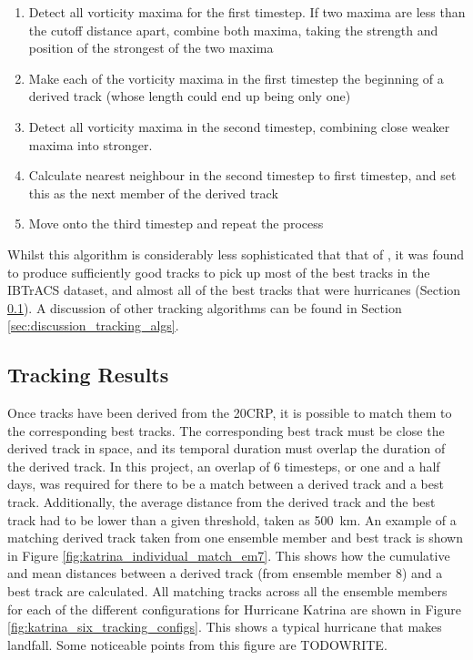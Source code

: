 \documentclass[pdftex,12pt,a4paper]{report}
\begin{document}
\begin{enumerate}
    \item Detect all vorticity maxima for the first timestep. If two maxima are less than the cutoff
        distance apart, combine both maxima, taking the strength and position of the strongest of
        the two maxima
    \item Make each of the vorticity maxima in the first timestep the beginning of a derived track
        (whose length could end up being only one)
    \item Detect all vorticity maxima in the second timestep, combining close weaker maxima into
        stronger. %
    \item Calculate nearest neighbour in the second timestep to first timestep, and set this as the
        next member of the derived track
    \item Move onto the third timestep and repeat the process
\end{enumerate}

Whilst this algorithm is considerably less sophisticated that that of \textcite{hodges1994}, it was
found to produce sufficiently good tracks to pick up most of the best tracks in the IBTrACS dataset,
and almost all of the best tracks that were hurricanes (Section  \ref{sec:results_tracking}). A
discussion of other tracking algorithms can be found in Section \ref{sec:discussion_tracking_algs}.

\subsection{Tracking Results}
\label{sec:results_tracking}

Once tracks have been derived from the 20CRP, it is possible to match them to the corresponding best
tracks. The corresponding best track must be close the derived track in space, and its temporal
duration must overlap the duration of the derived track. In this project, an overlap of 6 timesteps,
or one and a half days, was required for there to be a match between a derived track and a best
track.  Additionally, the average distance from the derived track and the best track had to be lower
than a given threshold, taken as \SI{500}{km}. An example of a matching derived track taken from
one ensemble member and best track is shown in Figure \ref{fig:katrina_individual_match_em7}.
This shows how the cumulative and mean distances between a derived track (from ensemble member 8)
and a best track are calculated. All matching tracks across all the ensemble members for each of the
different configurations for Hurricane Katrina are shown in Figure
\ref{fig:katrina_six_tracking_configs}. This shows a typical hurricane that makes landfall. Some
noticeable points from this figure are TODOWRITE.
\end{document}
